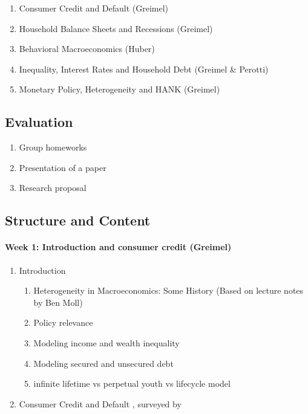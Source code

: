 \documentclass[a4paper,12pt]{article}
\begin{document}
\begin{enumerate}
\item Consumer Credit and Default (Greimel)
\item Household Balance Sheets and Recessions (Greimel)
\item Behavioral Macroeconomics (Huber)
\item Inequality, Interest Rates and Household Debt (Greimel \& Perotti)
\item Monetary Policy, Heterogeneity and HANK (Greimel)
\end{enumerate}

\subsection*{Evaluation}

\begin{enumerate}
\item Group homeworks
\item Presentation of a paper
\item Research proposal
\end{enumerate}

\subsection*{Structure and Content}

\paragraph{Week 1: Introduction and consumer credit (Greimel)}
\begin{enumerate}
\item Introduction
  \begin{enumerate}
  \item Heterogeneity in Macroeconomics: Some History (Based on lecture notes by Ben Moll)
  \item Policy relevance
  \item Modeling income and wealth inequality
  \item Modeling secured and unsecured debt
  \item infinite lifetime vs perpetual youth vs lifecycle model
  \end{enumerate}

\item Consumer Credit and Default \citep{athreya2002welfare,chatterjee2007quantitative,livshits2007consumer}, surveyed by \citet{exler2020consumer}
\end{enumerate}
\end{document}
